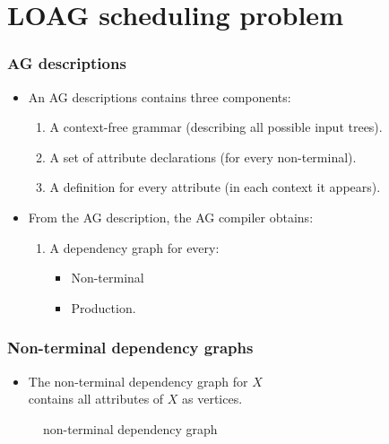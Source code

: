 \documentclass{beamer}
\begin{document}
\section{LOAG scheduling problem}
\begin{frame}
    \frametitle{AG descriptions}
    \begin{itemize}
        \item An AG descriptions contains three components:
        \begin{enumerate}
            \item A context-free grammar (describing all possible input trees).
            \item A set of attribute declarations (for every non-terminal).
            \item A definition for every attribute (in each context it appears).
        \end{enumerate}
        \item From the AG description, the AG compiler obtains:
        \begin{enumerate}
            \item A dependency graph for every:
                \begin{itemize} 
                    \item Non-terminal
                    \item Production.
                \end{itemize}
        \end{enumerate}
    \end{itemize}
\end{frame}

\begin{frame}
    \frametitle{Non-terminal dependency graphs}
    \begin{itemize}
        \item The non-terminal dependency graph for $X$\\
                contains all attributes of $X$ as vertices.
    \end{itemize}
    \begin{figure}

    \caption{non-terminal dependency graph}
    \end{figure}
\end{frame}
\end{document}
